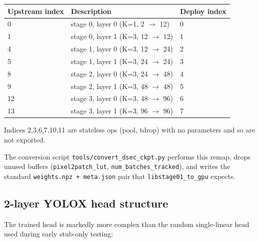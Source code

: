 \documentclass[11pt,a4paper]{article}
\begin{document}
\begin{tabularx}{\linewidth}{lXl}
\toprule
\textbf{Upstream index} & \textbf{Description}                       & \textbf{Deploy index} \\
\midrule
0  & stage 0, layer 0 (K=1, 2 $\to$ 12)                              & 0 \\
1  & stage 0, layer 1 (K=3, 12 $\to$ 12)                              & 1 \\
4  & stage 1, layer 0 (K=3, 12 $\to$ 24)                              & 2 \\
5  & stage 1, layer 1 (K=3, 24 $\to$ 24)                              & 3 \\
8  & stage 2, layer 0 (K=3, 24 $\to$ 48)                              & 4 \\
9  & stage 2, layer 1 (K=3, 48 $\to$ 48)                              & 5 \\
12 & stage 3, layer 0 (K=3, 48 $\to$ 96)                              & 6 \\
13 & stage 3, layer 1 (K=3, 96 $\to$ 96)                              & 7 \\
\bottomrule
\end{tabularx}

Indices 2,3,6,7,10,11 are stateless ops (pool, tdrop) with no
parameters and so are not exported.

The conversion script \texttt{tools/convert\_dsec\_ckpt.py} performs
this remap, drops unused buffers
(\texttt{pixel2patch\_lut}, \texttt{num\_batches\_tracked}), and writes
the standard \texttt{weights.npz + meta.json} pair that
\texttt{libstage01\_to\_gpu} expects.

\subsection{2-layer YOLOX head structure}

The trained head is markedly more complex than the random
single-linear head used during early stub-only testing:
\end{document}

